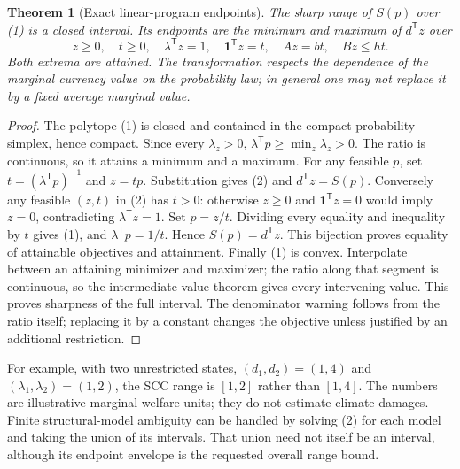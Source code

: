 \documentclass[11pt]{article}
\newtheorem{theorem}{Theorem}
\begin{document}
\begin{theorem}[Exact linear-program endpoints]\label{LP}
The sharp range of $S(p)$ over (1) is a closed interval. Its endpoints
are the minimum and maximum of $d^{\mathsf T}z$ over
\[
 z\geq0,\quad t\geq0,\quad
 \lambda^{\mathsf T}z=1,\quad
 \boldsymbol{1}^{\mathsf T}z=t,\quad Az=bt,\quad Bz\leq ht.    \tag{2}
\]
Both extrema are attained. The transformation respects the dependence of
the marginal currency value on the probability law; in general one may
not replace it by a fixed average marginal value.
\end{theorem}
\begin{proof}
The polytope (1) is closed and contained in the compact probability
simplex, hence compact. Since every $\lambda_z>0$,
$\lambda^{\mathsf T}p\geq\min_z\lambda_z>0$. The ratio is continuous,
so it attains a minimum and a maximum. For any feasible $p$, set
$t=(\lambda^{\mathsf T}p)^{-1}$ and $z=tp$. Substitution gives (2)
and $d^{\mathsf T}z=S(p)$.
Conversely any feasible $(z,t)$ in (2) has $t>0$: otherwise
$z\geq0$ and $\boldsymbol{1}^{\mathsf T}z=0$ would imply $z=0$,
contradicting $\lambda^{\mathsf T}z=1$. Set $p=z/t$.
Dividing every equality and inequality by $t$ gives (1), and
$\lambda^{\mathsf T}p=1/t$. Hence $S(p)=d^{\mathsf T}z$.
This bijection proves equality of attainable objectives and attainment.
Finally (1) is convex. Interpolate between an attaining minimizer and
maximizer; the ratio along that segment is continuous, so the intermediate
value theorem gives every intervening value. This proves sharpness of
the full interval. The denominator warning follows from the ratio itself;
replacing it by a constant changes the objective unless justified by an
additional restriction.
\end{proof}
For example, with two unrestricted states, $(d_1,d_2)=(1,4)$ and
$(\lambda_1,\lambda_2)=(1,2)$, the SCC range is $[1,2]$ rather than
$[1,4]$. The numbers are illustrative marginal welfare units; they do not
estimate climate damages. Finite structural-model ambiguity can be handled
by solving (2) for each model and taking the union of its intervals.
That union need not itself be an interval, although its endpoint envelope
is the requested overall range bound.
\end{document}
